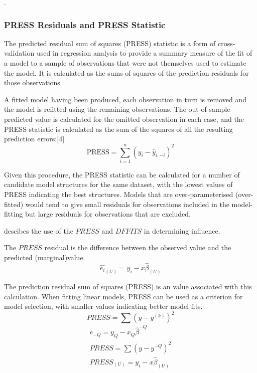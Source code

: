 \documentclass[12pt, a4paper]{report}
\theoremstyle{plain}
\theoremstyle{definition}
\theoremstyle{remark}
\begin{document}
.

	
	\subsubsection{PRESS Residuals and PRESS Statistic}
	The predicted residual sum of squares (PRESS) statistic is a form of cross-validation used in regression analysis to provide a summary measure of the fit of a model to a sample of observations that were not themselves used to estimate the model. It is calculated as the sums of squares of the prediction residuals for those observations.
	
	A fitted model having been produced, each observation in turn is removed and the model is refitted using the remaining observations. The out-of-sample predicted value is calculated for the omitted observation in each case, and the PRESS statistic is calculated as the sum of the squares of all the resulting prediction errors:[4]
	\[\mbox{PRESS} =\sum_{i=1}^n (y_i - \hat{y}_{i, -i})^2 \]

	Given this procedure, the PRESS statistic can be calculated for a number of candidate model structures for the same dataset, with the lowest values of PRESS indicating the best structures. Models that are over-parameterised (over-fitted) would tend to give small residuals for observations included in the model-fitting but large residuals for observations that are excluded.
	


	\citet{schabenberger} descibes the use of the $PRESS$ and $DFFITS$ in determining influence.
	
	The $PRESS$ residual is the difference between the observed value and the predicted (marginal)value.
	\begin{equation}
	\hat{e_{i}}_{(U)} = y_{i} - x\hat{\beta}_{(U)}
	\end{equation}
	
	The prediction residual sum of squares (PRESS) is an value associated with this calculation. When fitting linear models, PRESS can be used as a criterion for model selection, with smaller values indicating better model fits.
	\begin{equation}
	PRESS = \sum(y-y^{(k)})^2
	\end{equation}
	\begin{eqnarray*}
		e_{-Q} = y_{Q} - x_{Q}\hat{\beta}^{-Q}\\
		PRESS = \sum(y-y^{-Q})^2\\
		PRESS_{(U)} = y_{i} - x\hat{\beta}_{(U)}\\
	\end{eqnarray*}
	
\end{document}
